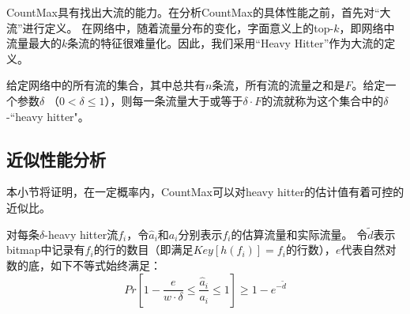 CountMax具有找出大流的能力。在分析CountMax的具体性能之前，首先对“大流”进行定义。
在网络中，随着流量分布的变化，字面意义上的top-$k$，即网络中流量最大的$k$条流的特征很难量化。因此，我们采用“Heavy Hitter”作为大流的定义。

给定网络中的所有流的集合，其中总共有$n$条流，所有流的流量之和是$F$。给定一个参数$\delta$ （$0<\delta \le 1$），则每一条流量大于或等于$\delta\cdot F$的流就称为这个集合中的$\delta$-``heavy hitter"。

\subsection{近似性能分析}
本小节将证明，在一定概率内，CountMax可以对heavy hitter的估计值有着可控的近似比。

\begin{theorem}
	\label{tm:query}
    对每条$\delta$-heavy hitter流$f_i$，令$\hat{a}_i$和$a_i$分别表示$f_i$的估算流量和实际流量。
    令$\tilde{d}$表示bitmap中记录有$f_i$的行的数目（即满足$Key[h(f_i)] = f_i$的行数），$e$代表自然对数的底，如下不等式始终满足：
	\begin{equation}
	\label{eq:hhacc}
	Pr[1-\frac{e}{w\cdot \delta}\le \frac{\hat{a}_i}{a_i} \le 1] \ge 1-e^{-\tilde{d}}
	\end{equation}
\end{theorem}

